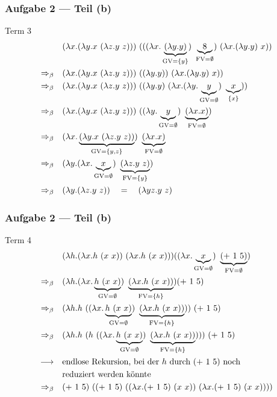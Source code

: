 \documentclass{beamer}
\DeclareMathOperator{\GV}{GV}
\DeclareMathOperator{\FV}{FV}
\begin{document}
\begin{frame}[t] \frametitle{Aufgabe 2 --- Teil (b)}
	Term 3
	\begin{align*}
		& (\lambda x . (\lambda y . x \ (\lambda z . y \ z))) \ (((\lambda x . \underbrace{(\lambda y . y )}_{\GV= \menge{y}}) \ \underbrace{8}_{\FV = \emptyset} ) \ (\lambda x . (\lambda y . y) \ x ))
		\\
		\Rightarrow_\beta \quad
		& (\lambda x . (\lambda y . x \ (\lambda z . y \ z))) \ ((\lambda y . y )) \ (\lambda x . (\lambda y . y) \ x ))
		\\
		\Rightarrow_\beta \quad
		& (\lambda x . (\lambda y . x \ (\lambda z . y \ z))) \ ((\lambda y . y ) \ (\lambda x . (\lambda y . \underbrace{y}_{\GV=\emptyset}) \ \underbrace{x}_{\menge{x}} ))
		\\
		\Rightarrow_\beta \quad
		& (\lambda x . (\lambda y . x \ (\lambda z . y \ z))) \ ((\lambda y . \underbrace{y}_{\GV = \emptyset} ) \ \underbrace{(\lambda x . x)}_{\FV = \emptyset})
		\\
		\Rightarrow_\beta \quad
		& (\lambda x . \underbrace{(\lambda y . x \ (\lambda z . y \ z))}_{\GV = \menge{y,z}}) \ \underbrace{(\lambda x . x)}_{\FV = \emptyset}
		\\
		\Rightarrow_\beta \quad
		& (\lambda y . (\lambda x . \underbrace{x}_{\GV = \emptyset}) \ \underbrace{(\lambda z . y \ z)}_{\FV = \menge{y}})
		\\
		\Rightarrow_\beta \quad
		& (\lambda y . (\lambda z . y \ z)) 
		\quad = \quad
		(\lambda yz . y \ z) 
	\end{align*}
\end{frame}

\begin{frame}[t] \frametitle{Aufgabe 2 --- Teil (b)}
	Term 4
	\begin{align*}
		& (\lambda h . (\lambda x . h \ (x \ x)) \ (\lambda x . h \ (x \ x))) ((\lambda x . \underbrace{x}_{\GV = \emptyset}) \ \underbrace{(+ \ 1 \ 5)}_{ \FV = \emptyset})
		\\
		\Rightarrow_\beta \quad
		& (\lambda h . (\lambda x . \underbrace{h \ (x \ x)}_{\GV = \emptyset}) \ \underbrace{(\lambda x . h \ (x \ x))}_{\FV = \menge{h}}) (+ \ 1 \ 5)
		\\
		\Rightarrow_\beta \quad
		& (\lambda h . h \ ((\lambda x . \underbrace{h \ (x \ x)}_{\GV = \emptyset}) \ \underbrace{(\lambda x . h \ (x \ x))}_{\FV= \menge{h}})) \ (+ \ 1 \ 5)
		\\
		\Rightarrow_\beta \quad
		& (\lambda h . h \ ( h \ ((\lambda x . \underbrace{h \ (x \ x)}_{\GV = \emptyset}) \ \underbrace{(\lambda x . h \ (x \ x))}_{\FV= \menge{h}}))) \ (+ \ 1 \ 5)
		\\
		\longrightarrow \quad
		&\text{endlose Rekursion, bei der $h$ durch $(+ \ 1 \ 5 )$ noch} \\
		&\text{reduziert werden könnte}
		\\
		\Rightarrow_\beta \quad
		& (+ \ 1 \ 5) \ ( (+ \ 1 \ 5) \ ((\lambda x . (+ \ 1 \ 5 ) \ (x \ x)) \ (\lambda x . (+ \ 1 \ 5 ) \ (x \ x))))	
	\end{align*}
\end{frame}
\end{document}
